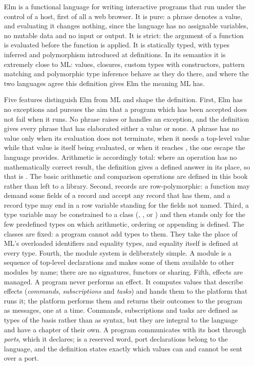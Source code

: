 Elm is a functional language for writing interactive programs that run
under the control of a host, first of all a web browser. It is pure: a
phrase denotes a value, and evaluating it changes nothing, since the
language has no assignable variables, no mutable data and no input or
output. It is strict: the argument of a function is evaluated before the
function is applied. It is statically typed, with types inferred and
polymorphism introduced at definitions. In its semantics it is extremely
close to ML: values, closures, custom types with constructors, pattern
matching and polymorphic type inference behave as they do there, and where
the two languages agree this definition gives Elm the meaning ML has. %

Five features distinguish Elm from ML and shape the definition. First, Elm
has no exceptions and pursues the aim that a program which has been accepted
does not fail when it runs. No phrase raises or handles an exception, and
the definition gives every phrase that has elaborated either a value or
none. A phrase has no value only when its evaluation does not terminate,
when it needs a top-level value while that value is itself being evaluated,
or when it reaches , the one escape the language provides.
Arithmetic is accordingly total: where an operation has no mathematically
correct result, the definition gives a defined answer in its place, so that
 is . %
The basic arithmetic and comparison operations are defined in this book
rather than left to a library. %
Second, records are row-polymorphic: a function may demand some fields of a
record and accept any record that has them, and a record type may end in a
row variable standing for the fields not named. %
Third, a type variable may be constrained to a class (,
,  or ) and then stands only for
the few predefined types on which arithmetic, ordering or appending is
defined. The classes are fixed: a program cannot add types to them. They
take the place of ML's overloaded identifiers and equality types, and
equality itself is defined at every type. %
Fourth, the module system is deliberately simple. A module is a sequence of
top-level declarations and makes some of them available to other modules by
name; there are no signatures, functors or sharing. %
Fifth, effects are managed. A program never performs an effect. It computes
values that describe effects (\emph{commands}, \emph{subscriptions} and
\emph{tasks}) and hands them to the platform that runs it; the platform
performs them and returns their outcomes to the program as messages, one
at a time. Commands, subscriptions and tasks are defined as types of the
basis rather than as syntax, but they are integral to the language and have
a chapter of their own. %
A program communicates with its host through \emph{ports}, which it
declares;  is a reserved word, port declarations belong to the
language, and the definition states exactly which values can and cannot be
sent over a port. %

